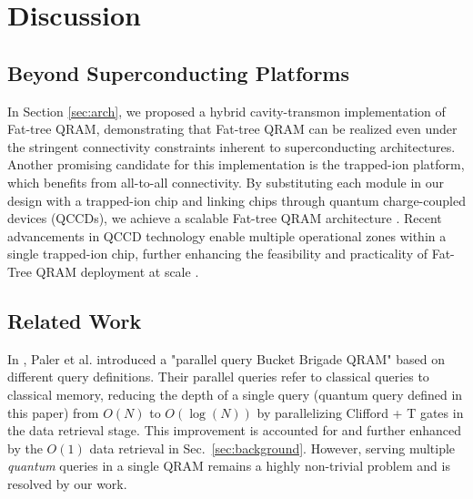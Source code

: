 \section{Discussion}\label{sec:discussion}

\subsection{Beyond Superconducting Platforms}
In Section \ref{sec:arch}, we proposed a hybrid cavity-transmon implementation of Fat-tree QRAM, demonstrating that Fat-tree QRAM can be realized even under the stringent connectivity constraints inherent to superconducting architectures. Another promising candidate for this implementation is the trapped-ion platform, which benefits from all-to-all connectivity. By substituting each module in our design with a trapped-ion chip and linking chips through quantum charge-coupled devices (QCCDs), we achieve a scalable Fat-tree QRAM architecture \cite{pino2021demonstration}. Recent advancements in QCCD technology enable multiple operational zones within a single trapped-ion chip, further enhancing the feasibility and practicality of Fat-Tree QRAM deployment at scale \cite{mordini2024multi}.

\subsection{Related Work}
In \cite{paler2020parallelizing}, Paler et al. introduced a "parallel query Bucket Brigade QRAM" based on different query definitions. Their parallel queries refer to classical queries to classical memory, reducing the depth of a single query (quantum query defined in this paper) from $O(N)$ to $O(\log(N))$ by parallelizing Clifford + T gates in the data retrieval stage. This improvement is accounted for and further enhanced by the $O(1)$ data retrieval in Sec.~\ref{sec:background}. However, serving multiple \emph{quantum} queries in a single QRAM remains a highly non-trivial problem and is resolved by our work.
